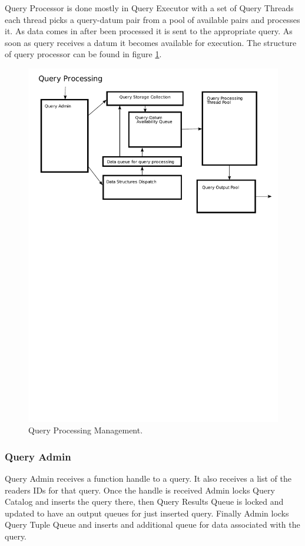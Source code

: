 \documentclass[11pt]{article}
\begin{document}
Query Processor is done mostly in Query Executor with a set of Query Threads each thread picks a query-datum pair from a pool of available pairs and processes it. As data comes in after been processed it is sent to the appropriate query. As soon as query receives a datum it becomes available for execution. The structure of query processor can be found in figure \ref{QueryProcessingPic}.

\begin{figure}
  \includegraphics[width=5.00in]{../figures/QueryProcessing.pdf}
  \caption{Query Processing Management.}
  \label{QueryProcessingPic}
\end{figure}

\subsubsection{Query Admin}

Query Admin receives a function handle to a query. It also receives a list of the readers IDs for that query. Once the handle is received Admin locks Query Catalog and inserts the query there, then Query Results Queue is locked and updated to have an output queues for just inserted query. Finally Admin locks Query Tuple Queue and inserts and additional queue for data associated with the query. 
\end{document}
